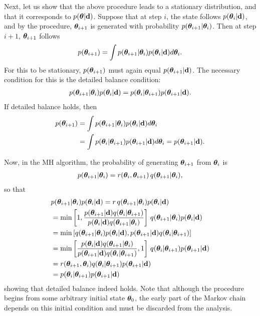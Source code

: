 Next, let us show that the above procedure leads to a stationary distribution, and that it corresponds to $p({\boldsymbol{\theta}}|{\bf d})$. Suppose that at step $i$, the state follows $p({\boldsymbol{\theta}}_i|{\bf d})$, and by the procedure, ${\boldsymbol{\theta}}_{i+1}$ is generated with probability $p({\boldsymbol{\theta}}_{i+1}|{\boldsymbol{\theta}}_{i})$. Then at step $i+1$, ${\boldsymbol{\theta}}_{i+1}$ follows
\begin{align}
p({\boldsymbol{\theta}}_{i+1}) = \int p({\boldsymbol{\theta}}_{i+1}|{\boldsymbol{\theta}}_{i}) p({\boldsymbol{\theta}}_i|{\bf d}) d {\boldsymbol{\theta}}_i .
\end{align}
For this to be stationary, $p({\boldsymbol{\theta}}_{i+1})$ must again equal $p({\boldsymbol{\theta}}_{i+1}|{\bf d})$. The necessary condition for this is the detailed balance condition:
\begin{align}
 p({\boldsymbol{\theta}}_{i+1}|{\boldsymbol{\theta}}_{i}) p({\boldsymbol{\theta}}_i|{\bf d}) = p({\boldsymbol{\theta}}_{i}|{\boldsymbol{\theta}}_{i+1}) p({\boldsymbol{\theta}}_{i+1}|{\bf d}) .
\end{align}
If detailed balance holds, then
\begin{align}
  p({\boldsymbol{\theta}}_{i+1}) &= \int p({\boldsymbol{\theta}}_{i+1}|{\boldsymbol{\theta}}_{i}) p({\boldsymbol{\theta}}_i|{\bf d}) d {\boldsymbol{\theta}}_i \nonumber \\
  &= \int p({\boldsymbol{\theta}}_{i}|{\boldsymbol{\theta}}_{i+1}) p({\boldsymbol{\theta}}_{i+1}|{\bf d}) d {\boldsymbol{\theta}}_i = p({\boldsymbol{\theta}}_{i+1}|{\bf d}) .
\end{align}

Now, in the MH algorithm, the probability of generating ${\boldsymbol{\theta}}_{i+1}$ from ${\boldsymbol{\theta}}_i$ is
\begin{align}
p({\boldsymbol{\theta}}_{i+1}|{\boldsymbol{\theta}}_{i}) = r({\boldsymbol{\theta}}_i,{\boldsymbol{\theta}}_{i+1}) \, q({\boldsymbol{\theta}}_{i+1}|{\boldsymbol{\theta}}_i) ,
\end{align}
so that
\begin{align}
  &p({\boldsymbol{\theta}}_{i+1}|{\boldsymbol{\theta}}_{i}) p({\boldsymbol{\theta}}_i|{\bf d}) = r \, q({\boldsymbol{\theta}}_{i+1}|{\boldsymbol{\theta}}_i) p({\boldsymbol{\theta}}_i|{\bf d}) \nonumber \\
  &= \mathrm{min} \left[1, \frac{p({\boldsymbol{\theta}}_{i+1}|{\bf d}) q({\boldsymbol{\theta}}_i|{\boldsymbol{\theta}}_{i+1})}{p({\boldsymbol{\theta}}_i|{\bf d}) q({\boldsymbol{\theta}}_{i+1}|{\boldsymbol{\theta}}_i)} \right] \, q({\boldsymbol{\theta}}_{i+1}|{\boldsymbol{\theta}}_i) p({\boldsymbol{\theta}}_i|{\bf d}) \nonumber \\
  &= \mathrm{min} \left[q({\boldsymbol{\theta}}_{i+1}|{\boldsymbol{\theta}}_i) p({\boldsymbol{\theta}}_i|{\bf d}) , p({\boldsymbol{\theta}}_{i+1}|{\bf d}) q({\boldsymbol{\theta}}_i|{\boldsymbol{\theta}}_{i+1}) \right] \, \nonumber \\
  &= \mathrm{min} \left[\frac{ p({\boldsymbol{\theta}}_i|{\bf d}) q({\boldsymbol{\theta}}_{i+1}|{\boldsymbol{\theta}}_i)}{p({\boldsymbol{\theta}}_{i+1}|{\bf d}) q({\boldsymbol{\theta}}_i|{\boldsymbol{\theta}}_{i+1})} , 1 \right] \, q({\boldsymbol{\theta}}_i|{\boldsymbol{\theta}}_{i+1}) p({\boldsymbol{\theta}}_{i+1}|{\bf d}) \nonumber \\
  &=  r({\boldsymbol{\theta}}_{i+1},{\boldsymbol{\theta}}_i)  q({\boldsymbol{\theta}}_i|{\boldsymbol{\theta}}_{i+1}) p({\boldsymbol{\theta}}_{i+1}|{\bf d}) \nonumber \\
  &= p({\boldsymbol{\theta}}_i|{\boldsymbol{\theta}}_{i+1}) p({\boldsymbol{\theta}}_{i+1}|{\bf d})
\end{align}
showing that detailed balance indeed holds. Note that although the procedure begins from some arbitrary initial state ${\boldsymbol{\theta}}_0$, the early part of the Markov chain depends on this initial condition and must be discarded from the analysis.

